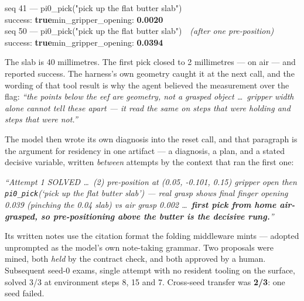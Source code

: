 \documentclass[11pt,a4paper]{report}
\begin{document}
\begin{evidence}[title={The discriminator: same prompt, same cell, one move apart}]
\ttfamily\footnotesize
seq 41 --- pi0\_pick("pick up the flat butter slab")\\
\hspace*{2em}success: \textbf{true}\quad min\_gripper\_opening: \textbf{0.0020}\\[0.4em]
seq 50 --- pi0\_pick("pick up the flat butter slab")\ \ \textrm{\emph{(after one pre-position)}}\\
\hspace*{2em}success: \textbf{true}\quad min\_gripper\_opening: \textbf{0.0394}
\end{evidence}

\noindent
The slab is 40 millimetres. The first pick closed to 2 millimetres --- on air ---
and reported success. The harness's own geometry caught it at the next call, and
the wording of that tool result is why the agent believed the measurement over
the flag: \emph{``the points below the eef are geometry, not a grasped object
\ldots\ gripper width alone cannot tell these apart --- it read the same on steps
that were holding and steps that were not.''}

The model then wrote its own diagnosis into the reset call, and that paragraph
is the argument for residency in one artifact --- a diagnosis, a plan, and a
stated decisive variable, written \emph{between} attempts by the context that
ran the first one:

\begin{evidence}[title={The model's reset reason, verbatim}]
\small\itshape
``Attempt 1 SOLVED \ldots\ (2) pre-position at (0.05, -0.101, 0.15) gripper open
then \textrm{\texttt{pi0\_pick}}(`pick up the flat butter slab') --- real grasp
shows final finger opening 0.039 (pinching the 0.04 slab) vs air grasp 0.002
\ldots\ \textbf{first pick from home air-grasped, so pre-positioning above the
butter is the decisive rung.}''
\end{evidence}

\noindent
Its written notes use the citation format the folding middleware mints ---
adopted unprompted as the model's own note-taking grammar. Two proposals were
mined, both \emph{held} by the contract check, and both approved by a human.
Subsequent seed-0 exams, single attempt with no resident tooling on the surface,
solved 3/3 at environment steps 8, 15 and 7. Cross-seed transfer was
\textbf{2/3}: one seed failed.
\end{document}

